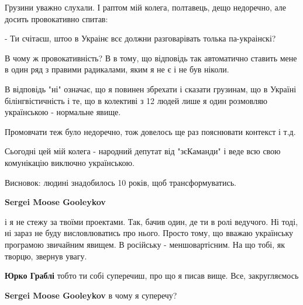 \begin{itemize}
\begin{itemize}
Грузини уважно слухали. І раптом мій колега, полтавець, дещо недоречно, але досить провокативно спитав:

- Ти счітаєш, штоо в Украінє всє должни разговарівать толька па-украінскі?

В чому ж провокативність? В в тому, що відповідь так автоматично ставить мене в
один ряд з правими радикалами, яким я не є і не був ніколи.

В відповідь "ні" означає, що я повинен збрехати і сказати грузинам, що в
Україні білінгвістичність і те, що в колективі з 12 людей лише я один розмовляю
українською - нормальне явище.

Промовчати теж було недоречно, тож довелось ще раз пояснювати контекст і т.д.

Сьогодні цей мій колега - народний депутат від "зєКаманди" і веде всю свою
комунікацію виключно українською.

Висновок: людині знадобилось 10 років, щоб трансформуватись.


 
\textbf{Sergei Moose Gooleykov} 

і я не стежу за твоїми проектами. Так, бачив один, де ти в ролі ведучого. Ні
тоді, ні зараз не буду висловлюватись про нього. Просто тому, що вважаю
українську програмою звичайним явищем. В російську - меншовартісним. На що
тобі, як творцю, звернув увагу.


 
\textbf{Юрко Граблі} тобто ти собі суперечиш, про що я писав вище. Все, закругляємось \Smiley[1.0][yellow]

 
\textbf{Sergei Moose Gooleykov} в чому я суперечу?

 

\end{itemize}
\end{itemize}
